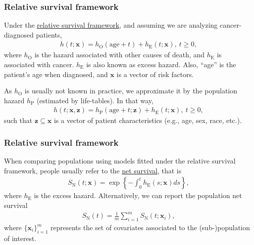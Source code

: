 \documentclass[10pt, aspectratio = 169, handout]{beamer} %
\begin{document}
	\begin{frame}[t]
		\frametitle{Relative survival framework}
		\justifying
    	Under the \ul{relative survival framework}, and assuming we are analyzing cancer-diagnosed patients,
    	\begin{align*}
        	h(t; \mathbf{x}) = h_{\text{O}}(\text{age} + t) + h_{\text{E}}(t; \mathbf{x}),~ t \geq 0,
    	\end{align*}
    	where $h_{\text{O}}$ is the hazard associated with other causes of death, and $h_{\text{E}}$ is associated with cancer. $h_{\text{E}}$ is also known as excess hazard. Also, ``age'' is the patient's age when diagnosed, and $\mathbf{x}$ is a vector of risk factors.
    	
    	As $h_{\text{O}}$ is usually not known in practice, we approximate it by the population hazard $h_{\text{P}}$ (estimated by life-tables). In that way,
    		\begin{align*}
    			h(t; \mathbf{x}, \mathbf{z}) = h_{\text{P}}(\text{age} + t; \mathbf{z}) + h_{\text{E}}(t; \mathbf{x}),~ t \geq 0,
    		\end{align*}
    	such that $\mathbf{z} \subseteq \mathbf{x}$ is a vector of patient characteristics (e.g., age, sex, race, etc.).
	\end{frame}
	
	\begin{frame}[t]
		\frametitle{Relative survival framework}
		\justifying
        When comparing populations using models fitted under the relative survival framework, people usually refer to the \ul{net survival}, that is
		\begin{align*}
			S_{\text{N}}(t; \mathbf{x}) = \exp\left\{-\int^t_0 h_{\text{E}}(s; \mathbf{x})ds\right\},
		\end{align*}
		where $h_{\text{E}}$ is the excess hazard. Alternatively, we can report the population net survival
		\begin{align*}
			S_{\text{N}}(t) = \frac{1}{m}\sum_{i = 1}^{m}S_{\text{N}}(t; \mathbf{x}_i),
		\end{align*}
        where $\{\mathbf{x}_i\}_{i=1}^m$ represents the set of covariates associated to the (sub-)population of interest.
	\end{frame}
\end{document}
